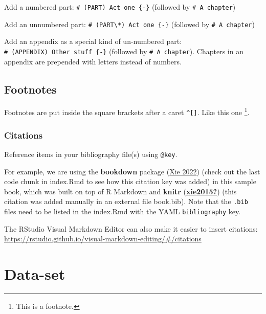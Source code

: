 \documentclass[
  11pt,
  a4paper,
  twoside]{scrbook}
\begin{document}
Add a numbered part: \texttt{\#\ (PART)\ Act\ one\ \{-\}} (followed by \texttt{\#\ A\ chapter})

Add an unnumbered part: \texttt{\#\ (PART\textbackslash{}*)\ Act\ one\ \{-\}} (followed by \texttt{\#\ A\ chapter})

Add an appendix as a special kind of un-numbered part: \texttt{\#\ (APPENDIX)\ Other\ stuff\ \{-\}} (followed by \texttt{\#\ A\ chapter}). Chapters in an appendix are prepended with letters instead of numbers.

\hypertarget{footnotes}{%
\section{Footnotes}\label{footnotes}}

Footnotes are put inside the square brackets after a caret \texttt{\^{}{[}{]}}. Like this one \footnote{This is a footnote.}.

\hypertarget{citations}{%
\subsection{Citations}\label{citations}}

Reference items in your bibliography file(s) using \texttt{@key}.

For example, we are using the \textbf{bookdown} package (\protect\hyperlink{ref-R-bookdown}{Xie 2022}) (check out the last code chunk in index.Rmd to see how this citation key was added) in this sample book, which was built on top of R Markdown and \textbf{knitr} (\protect\hyperlink{ref-xie2015}{\textbf{xie2015?}}) (this citation was added manually in an external file book.bib).
Note that the \texttt{.bib} files need to be listed in the index.Rmd with the YAML \texttt{bibliography} key.

The RStudio Visual Markdown Editor can also make it easier to insert citations: \url{https://rstudio.github.io/visual-markdown-editing/\#/citations}

\hypertarget{data-set-1}{%
\chapter{Data-set}\label{data-set-1}}

\linespread{1}
\end{document}
